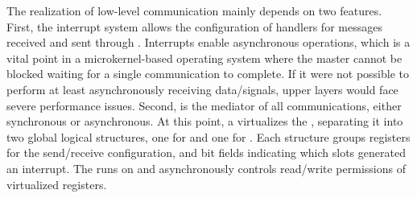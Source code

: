 

			The realization of low-level communication mainly depends on two \mppa features.
			First, the interrupt system allows the configuration of handlers for messages
			received and sent through \noc. Interrupts enable asynchronous operations,
			which is a vital point in a microkernel-based operating system where the
			master cannot be blocked waiting for a single communication to complete.
			If it were not possible to perform at least asynchronously receiving
			data/signals, upper layers would face severe performance issues. Second,
			\dma is the mediator of all communications, either synchronous or asynchronous.
			At this point, a \hypervisor virtualizes the \dma, separating it into two global
			logical structures, one for \cnoc and one for \dnoc. Each structure groups
			registers for the send/receive configuration, and bit fields indicating which
			slots generated an interrupt. The \hypervisor runs on \rms and asynchronously
			controls read/write permissions of virtualized registers.

